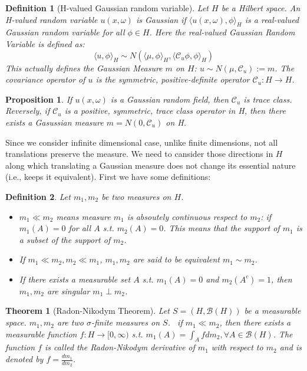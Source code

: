 \documentclass{article}
\newtheorem{theorem}{Theorem}
\newtheorem{definition}{Definition}
\newtheorem{proposition}{Proposition}
\begin{document}
\begin{definition}[H-valued Gaussian random variable]
  Let $H$ be a Hilbert space. An H-valued random variable $u(x, \omega)$ is Gaussian if 
  $\langle u(x, \omega), \phi\rangle_H$ is a real-valued Gaussian random variable for all $\phi \in H$.
  Here the real-valued Gaussian Random Variable is defined as:
  \begin{equation}
    \langle u, \phi\rangle_H \sim N(\langle \mu, \phi\rangle_H, \langle \mathcal{C}_u\phi, \phi\rangle_H)
  \end{equation}
  This actually defines the Gaussian Measure $m$ on $H$: $u\sim N(\mu, \mathcal{C}_u):= m$. 
  The covariance operator of $u$ is the symmetric, positive-definite operator $\mathcal{C}_u : H \rightarrow H$.
\end{definition}

\begin{proposition}
  If $u(x, \omega)$ is a Gaussian random field, then $\mathcal{C}_u$ is trace class. 
  Reversely, if $\mathcal{C}_u$ is a positive, symmetric, trace class operator in H, then there exists a Gasussian measure $m=N(0, \mathcal{C}_u)$ on H.
\end{proposition}

Since we consider infinite dimensional case, unlike finite dimensions, not all translations preserve the measure. 
We need to cansider those directions in $H$ along which translating a Gaussian measure does not change its essential nature (i.e., keeps it equivalent). 
First we have some definitions:
\begin{definition}
  Let $m_1, m_2$ be two measures on $H$.
  \begin{itemize}
    \item $m_1 \ll m_2$ means measure $m_1$ is absoutely continuous respect to $m_2$: if $m_1(A) = 0$ for all $A$ s.t. $m_2(A) = 0$. 
     This means that the support of $m_1$ is a subset of the support of $m_2$.
    \item If $m_1 \ll m_2, m_2 \ll m_1$, $m_1, m_2$ are said to be equivalent $m_1 \sim m_2$.
    \item If there exists a measurable set $A$ s.t. $m_1(A) = 0$ and $m_2(A^c) =1$, then $m_1, m_2$ are singular $m_1 \perp m_2$. 
  \end{itemize}
\end{definition}

\begin{theorem}[Radon-Nikodym Theorem]
  Let $S = (H,\mathcal{B}(H))$ be a measurable space. $m_1, m_2$ are two $\sigma$-finite measures on $S$. \
  if $m_1 \ll m_2$, then there exists a measurable function $f:H\rightarrow [0, \infty)$ s.t. $m_1(A) = \int_A f dm_2, \forall A \in \mathcal{B}(H)$.
  The function $f$ is called the Radon-Nikodym derivative of $m_1$ with respect to $m_2$ and is denoted by $f = \frac{dm_1}{dm_2}$.
\end{theorem}
\end{document}
